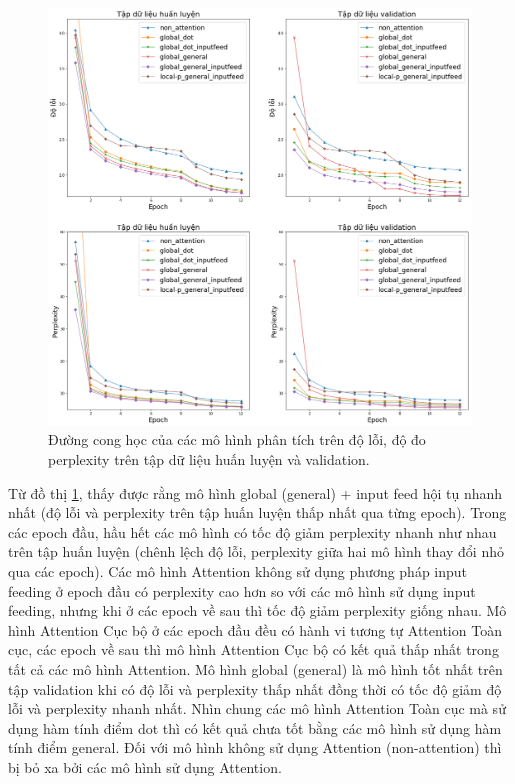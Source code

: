 \begin{figure}
	\centering
	\includegraphics[width=1.0\textwidth]{train_valid_xent_ppl_scaled_retrain.png}
	\caption[Đường cong học của các mô hình]{Đường cong học của các mô hình phân tích trên độ lỗi, độ đo perplexity trên tập dữ liệu huấn luyện và validation.}
	\label{fig_learning_curve}
\end{figure}

Từ đồ thị \ref{fig_learning_curve}, thấy được rằng mô hình global (general) + input feed hội tụ nhanh nhất (độ lỗi và perplexity trên tập huấn luyện thấp nhất qua từng epoch). Trong các epoch đầu, hầu hết các mô hình có tốc độ giảm perplexity nhanh như nhau trên tập huấn luyện (chênh lệch độ lỗi, perplexity giữa hai mô hình thay đổi nhỏ qua các epoch). Các mô hình Attention không sử dụng phương pháp input feeding ở epoch đầu có perplexity cao hơn so với các mô hình sử dụng input feeding, nhưng khi ở các epoch về sau thì tốc độ giảm perplexity giống nhau. Mô hình Attention Cục bộ ở các epoch đầu đều có hành vi tương tự Attention Toàn cục, các epoch về sau thì mô hình Attention Cục bộ có kết quả thấp nhất trong tất cả các mô hình Attention. Mô hình global (general) là mô hình tốt nhất trên tập validation khi có độ lỗi và perplexity thấp nhất đồng thời có tốc độ giảm độ lỗi và perplexity nhanh nhất. Nhìn chung các mô hình Attention Toàn cục mà sử dụng hàm tính điểm dot thì có kết quả chưa tốt bằng các mô hình sử dụng hàm tính điểm general. Đối với mô hình không sử dụng Attention (non-attention) thì bị bỏ xa bởi các mô hình sử dụng Attention.

